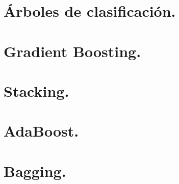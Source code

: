 \documentclass[12pt,letterpaper]{article}
\begin{document}
\section{Árboles de clasificación.}
\section{Gradient Boosting.}
\section{Stacking.}
\section{AdaBoost.}
\section{Bagging.}
\printbibliography
\end{document}
